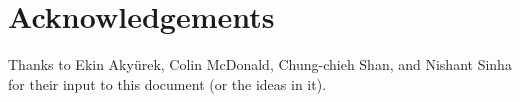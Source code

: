 \documentclass{article}
\begin{document}




\section*{Acknowledgements}

Thanks to Ekin Aky\"{u}rek, Colin McDonald, Chung-chieh Shan, and Nishant Sinha for their input to this document (or the ideas in it).

\iffalse %
\section*{References}
\fi



\end{document}
